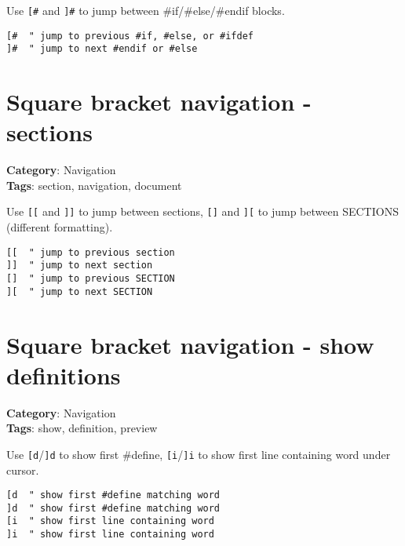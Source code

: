 {{{{{{{{{{Use {\footnotesize \Verb§[#§} and {\footnotesize \Verb§]#§} to jump between \#if/\#else/\#endif blocks.

\begin{Exa*}{}
\begin{Verbatim}[fontsize=\footnotesize, breaklines, breakanywhere]
[#  " jump to previous #if, #else, or #ifdef
]#  " jump to next #endif or #else
\end{Verbatim}
\end{Exa*}

\section{Square bracket navigation - sections}

\textbf{Category}: Navigation\\ \textbf{Tags}: section, navigation, document
\vspace{0.5cm}

Use {\footnotesize \Verb§[[§} and {\footnotesize \Verb§]]§} to jump between sections, {\footnotesize \Verb§[]§} and {\footnotesize \Verb§][§} to jump between SECTIONS (different formatting).

\begin{Exa*}{}
\begin{Verbatim}[fontsize=\footnotesize, breaklines, breakanywhere]
[[  " jump to previous section
]]  " jump to next section
[]  " jump to previous SECTION
][  " jump to next SECTION
\end{Verbatim}
\end{Exa*}

\section{Square bracket navigation - show definitions}

\textbf{Category}: Navigation\\ \textbf{Tags}: show, definition, preview
\vspace{0.5cm}

Use {\footnotesize \Verb§[d§}/{\footnotesize \Verb§]d§} to show first \#define, {\footnotesize \Verb§[i§}/{\footnotesize \Verb§]i§} to show first line containing word under cursor.

\begin{Exa*}{}
\begin{Verbatim}[fontsize=\footnotesize, breaklines, breakanywhere]
[d  " show first #define matching word
]d  " show first #define matching word
[i  " show first line containing word
]i  " show first line containing word
\end{Verbatim}
\end{Exa*}

}}}}}}}}}}
